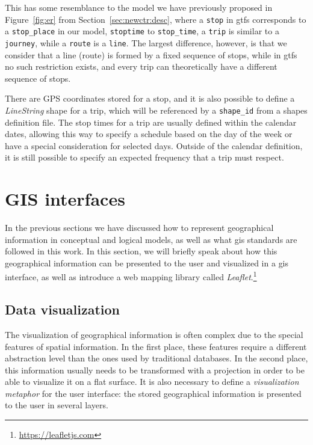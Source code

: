 	This has some resemblance to the model we have previously proposed in Figure~\ref{fig:er} from Section~\ref{sec:newctr:desc}, where a \texttt{stop} in \gls{gtfs} corresponds to a \texttt{stop\_place} in our model, \texttt{stoptime} to \texttt{stop\_time}, a \texttt{trip} is similar to a \texttt{journey}, while a \texttt{route} is a \texttt{line}. The largest difference, however, is that we consider that a line (route) is formed by a fixed sequence of stops, while in \gls{gtfs} no such restriction exists, and every trip can theoretically have a different sequence of stops.
	
	There are GPS coordinates stored for a stop, and it is also possible to define a \textit{LineString} shape for a trip, which will be referenced by a \texttt{shape\_id} from a shapes definition file. The stop times for a trip are usually defined within the calendar dates, allowing this way to specify a schedule based on the day of the week or have a special consideration for selected days. Outside of the calendar definition, it is still possible to specify an expected frequency that a trip must respect.
    
    \section{GIS interfaces}
	In the previous sections we have discussed how to represent geographical information in conceptual and logical models, as well as what \gls{gis} standards are followed in this work. In this section, we will briefly speak about how this geographical information can be presented to the user and visualized in a \gls{gis} interface, as well as introduce a web mapping library called {\em Leaflet}.\footnote{\url{https://leafletjs.com}}
    
    \subsection{Data visualization}
    The visualization of geographical information is often complex due to the special features of spatial information. In the first place, these features require a different abstraction level than the ones used by traditional databases. In the second place, this information usually needs to be transformed with a projection in order to be able to visualize it on a flat surface. It is also necessary to define a \textit{visualization metaphor} for the user interface: the stored geographical information is presented to the user in several layers.
    
